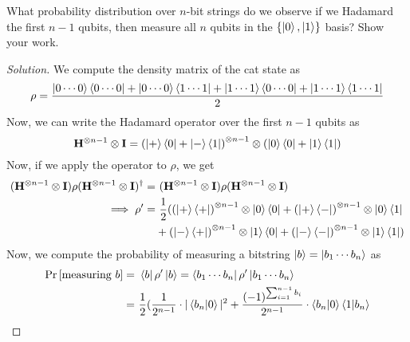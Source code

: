 \begin{solution}[label=ques:2a]
  \begin{question}
    What probability distribution over $n$-bit strings do we observe if
we Hadamard the first $n-1$ qubits, then measure all $n$ qubits in the
$\{\ket{0},\ket{1}\}$ basis? Show your work.
  \end{question}
  \tcblower{}
  \begin{proof}[Solution]
    We compute the density matrix of the cat state as
    \begin{equation}
      \rho = \frac{\ket{0\cdots0}\bra{0\cdots0} + \ket{0\cdots0}\bra{1\cdots1} + \ket{1\cdots1}\bra{0\cdots0} + \ket{1\cdots1}\bra{1\cdots1}}{2}
      \label{eq:catrho}
    \end{equation}
    Now, we can write the Hadamard operator over the first $n - 1$ qubits as
    \begin{equation}
      \mathbf{H}^{\otimes n - 1}\otimes \mathbf{I} = \left(\ket{+}\bra{0} + \ket{-}\bra{1}\right)^{\otimes n - 1}\otimes \left(\ket{0}\bra{0} + \ket{1}\bra{1}\right)
      \label{eq:hadn1}
    \end{equation}
    Now, if we apply the operator to $\rho$, we get
    \begin{equation}
      \begin{split}
        (\bfH^{\otimes n - 1}\otimes \bfI)\rho(\bfH^{\otimes n - 1}\otimes \bfI)^\dagger = &\ (\bfH^{\otimes n - 1}\otimes \bfI)\rho(\bfH^{\otimes n - 1}\otimes \bfI)\\
        \implies \rho' = &\ \frac{1}{2}(\left(\ketbra{+}\right)^{\otimes n - 1}\otimes\ketbra{0} + \left(\ketbraa{+}{-}\right)^{\otimes n - 1}\otimes\ketbraa{0}{1}\\
        &+ \left(\ketbraa{-}{+}\right)^{\otimes n - 1}\otimes\ketbraa{1}{0} + \left(\ketbra{-}\right)^{\otimes n - 1}\otimes\ketbra{1})
      \end{split}
      \label{eq:hadn1rho}
    \end{equation}
    Now, we compute the probability of measuring a bitstring $\ket{b} = \ket{b_1\cdots b_n}$ as
    \begin{equation}
      \begin{split}
        \prob{\text{measuring }b} = &\ \bra{b}\rho'\ket{b} = \bra{b_1\cdots b_n}\rho'\ket{b_1\cdots b_n}\\
        = &\ \frac{1}{2}(\frac{1}{2^{n - 1}}\cdot|\brakett{b_n}{0}|^2 + \frac{(-1)^{\sum_{i=1}^{n-1}b_i}}{2^{n - 1}}\cdot\brakett{b_n}{0}\brakett{1}{b_n}\\

\end{split}
\end{equation}
\end{proof}
\end{solution}

